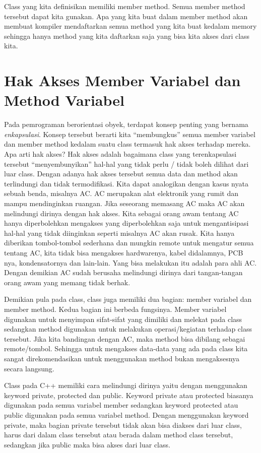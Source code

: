 Class yang kita definisikan memiliki member method. Semua member method
tersebut dapat kita gunakan. Apa yang kita buat dalam member method akan
membuat kompiler mendaftarkan semua method yang kita buat kedalam memory
sehingga hanya method yang kita daftarkan saja yang bisa kita akses dari
class kita.

\section{Hak Akses Member Variabel dan Method
Variabel}\label{hak-akses-member-variabel-dan-method-variabel}

Pada pemrograman berorientasi obyek, terdapat konsep penting yang
bernama \emph{enkapsulasi}. Konsep tersebut berarti kita ``membungkus''
semua member variabel dan member method kedalam suatu class termasuk hak
akses terhadap mereka. Apa arti hak akses? Hak akses adalah bagaimana
class yang terenkapsulasi tersebut ``menyembunyikan'' hal-hal yang tidak
perlu / tidak boleh dilihat dari luar class. Dengan adanya hak akses
tersebut semua data dan method akan terlindungi dan tidak termodifikasi.
Kita dapat analogikan dengan kasus nyata sebuah benda, misalnya AC. AC
merupakan alat elektronik yang rumit dan mampu mendinginkan ruangan.
Jika seseorang memasang AC maka AC akan melindungi dirinya dengan hak
akses. Kita sebagai orang awam tentang AC hanya diperbolehkan mengakses
yang diperbolehkan saja untuk mengantisipasi hal-hal yang tidak
diinginkan seperti misalnya AC akan rusak. Kita hanya diberikan
tombol-tombol sederhana dan mungkin remote untuk mengatur semua tentang
AC, kita tidak bisa mengakses hardwarenya, kabel didalamnya, PCB nya,
kondensatornya dan lain-lain. Yang bisa melakukan itu adalah para ahli
AC. Dengan demikian AC sudah berusaha melindungi dirinya dari
tangan-tangan orang awam yang memang tidak berhak.

Demikian pula pada class, class juga memiliki dua bagian: member
variabel dan member method. Kedua bagian ini berbeda fungsinya. Member
variabel digunakan untuk menyimpan sifat-sifat yang dimiliki dan melekat
pada class sedangkan method digunakan untuk melakukan operasi/kegiatan
terhadap class tersebut. Jika kita bandingan dengan AC, maka method bisa
dibilang sebagai remote/tombol. Sehingga untuk mengakses data-data yang
ada pada class kita sangat direkomendasikan untuk menggunakan method
bukan mengaksesnya secara langsung.

Class pada C++ memiliki cara melindungi dirinya yaitu dengan menggunakan
keyword private, protected dan public. Keyword private atau protected
biasanya digunakan pada semua variabel member sedangkan keyword
protected atau public digunakan pada semua variabel method. Dengan
menggunakan keyword private, maka bagian private tersebut tidak akan
bisa diakses dari luar class, harus dari dalam class tersebut atau
berada dalam method class tersebut, sedangkan jika public maka bisa
akses dari luar class.

